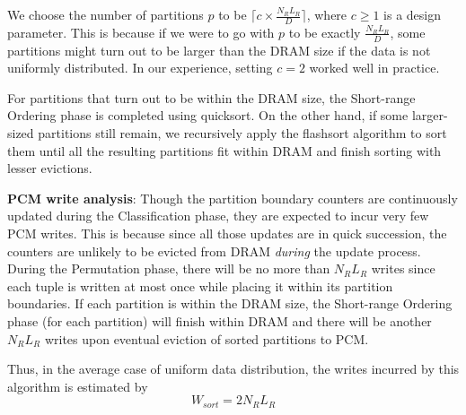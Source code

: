 We choose the number of partitions $p$ to be $\lceil c \times \frac{N_R L_R}{D} \rceil$, where $c \geq 1$ is a design
parameter. This is because if we were to go with $p$ to be exactly $\frac{N_R L_R}{D}$, some partitions might turn out to be larger than the DRAM size if the data is not uniformly distributed. In our experience, setting $c = 2$ worked well in practice.

%

For partitions that turn
out to be within the DRAM size, the Short-range Ordering phase is completed using
quicksort. On the other hand, if some larger-sized
partitions still remain, we recursively apply the flashsort
algorithm to sort them until all the resulting partitions fit within DRAM and finish sorting with lesser evictions.

\textbf{PCM write analysis}: Though the partition boundary counters
are continuously updated during the Classification phase, they are expected to
incur very few PCM writes. This is because since all those updates are
in quick succession, the counters are unlikely to be evicted from DRAM
\emph{during} the update process. During the
Permutation phase, there will be no more than $N_R L_R$ writes since each tuple is written
at most once while placing it within its partition boundaries. If each
partition is within the DRAM size, the Short-range Ordering phase (for each partition)
will finish within DRAM and there will be another $N_R L_R$ writes upon
eventual eviction of sorted partitions to PCM. 

Thus, in the average case of uniform data distribution, the writes incurred by this algorithm is estimated by
\begin{equation}
\label{eq:mpivot}
  W_{sort} = 2N_RL_R
\end{equation}